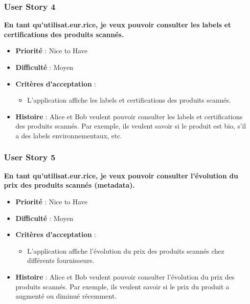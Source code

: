 \subsubsection{User Story 4}

\textbf{En tant qu'utilisat.eur.rice, je veux pouvoir consulter les labels et certifications des produits scannés.}

\begin{itemize}[noitemsep]
    \item \textbf{Priorité} : Nice to Have
    \item \textbf{Difficulté} : Moyen
    \item \textbf{Critères d'acceptation} :
          \begin{itemize}[noitemsep]
              \item L'application affiche les labels et certifications des produits scannés.
          \end{itemize}
    \item \textbf{Histoire} : Alice et Bob veulent pouvoir consulter les labels et certifications des produits scannés. Par exemple, ils veulent savoir si le produit est bio, s'il a des labels environnementaux, etc.
\end{itemize}

\subsubsection{User Story 5}

\textbf{En tant qu'utilisat.eur.rice, je veux pouvoir consulter l'évolution du prix des produits scannés (metadata).}

\begin{itemize}[noitemsep]
    \item \textbf{Priorité} : Nice to Have
    \item \textbf{Difficulté} : Moyen
    \item \textbf{Critères d'acceptation} :
          \begin{itemize}[noitemsep]
              \item L'application affiche l'évolution du prix des produits scannés chez différents fournisseurs.
          \end{itemize}
    \item \textbf{Histoire} : Alice et Bob veulent pouvoir consulter l'évolution du prix des produits scannés. Par exemple, ils veulent savoir si le prix du produit a augmenté ou diminué récemment.
\end{itemize}

